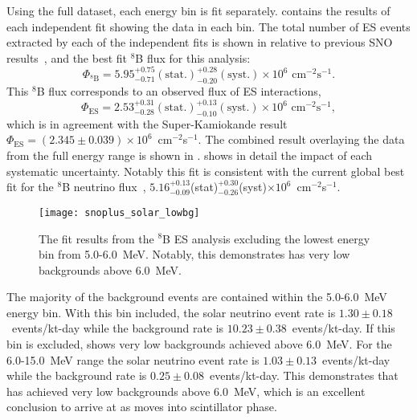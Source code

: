 Using the full dataset, each energy bin is fit separately.
 contains the results of each independent fit showing the data in each bin.
The total number of ES events extracted by each of the independent fits is shown in  relative to previous SNO results~\cite{3phase}, and the best fit $^8$B flux for this analysis: 
\begin{equation}
\Phi_{\mathrm{^8B}} = 5.95^{+0.75}_{-0.71}\mathrm{(stat.)}^{+0.28}_{-0.20}\mathrm{(syst.)} \times 10^6\,\,\mathrm{cm}^{-2}\mathrm{s}^{-1}.
\end{equation}
This $^8$B flux corresponds to an observed flux of ES interactions,
\begin{equation}
\Phi_{\mathrm{ES}} = 2.53^{+0.31}_{-0.28}\mathrm{(stat.)}^{+0.13}_{-0.10}\mathrm{(syst.)} \times 10^6\,\,\mathrm{cm}^{-2}\mathrm{s}^{-1},
\end{equation}
which is in agreement with the Super-Kamiokande result~\cite{superkiv} $\Phi_{\mathrm{ES}} = (2.345\pm0.039)\times 10^6$~cm$^{-2}$s$^{-1}$.
The combined result overlaying the data from the full energy range is shown in .
 shows in detail the impact of each systematic uncertainty. 
Notably this fit is consistent with the current global best fit for the $^8$B neutrino flux~\cite{GlobalSolarFlux}, $5.16^{+0.13}_{-0.09}$(stat)$^{+0.30}_{-0.26}$(syst)$\times 10^6$~cm$^{-2}$s$^{-1}$.

\begin{figure}
\centering
\texttt{[image: snoplus\_solar\_lowbg]}
\caption{The fit results from the {\snop} $^8$B ES analysis excluding the lowest energy bin from 5.0-6.0~MeV. Notably, this demonstrates {\snop} has very low backgrounds above 6.0~MeV.}
\label{fig:solar:lowbg}
\end{figure}

The majority of the background events are contained within the 5.0-6.0~MeV energy bin.
With this bin included, the solar neutrino event rate is $1.30\pm0.18$~events/kt-day while the background rate is $10.23\pm0.38$~events/kt-day.
If this bin is excluded,  shows very low backgrounds {\snop} achieved above 6.0~MeV.
For the 6.0-15.0~MeV range the solar neutrino event rate is $1.03\pm0.13$~events/kt-day while the background rate is $0.25\pm0.08$~events/kt-day.
This demonstrates that {\snop} has achieved very low backgrounds above 6.0~MeV, which is an excellent conclusion to arrive at as {\snop} moves into scintillator phase.
